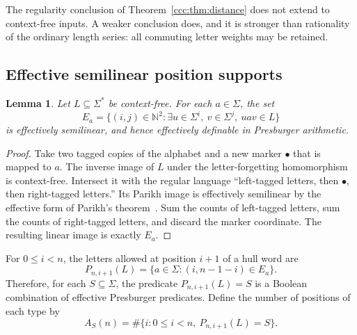 \documentclass[11pt,letterpaper]{article}
\newtheorem{lemma}[theorem]{Lemma}
\theoremstyle{definition}
\theoremstyle{remark}
\newcommand{\N}{\mathbb N}
\begin{document}
The regularity conclusion of Theorem~\ref{ccc:thm:distance} does not extend to
context-free inputs. A weaker conclusion does, and it is stronger than
rationality of the ordinary length series: all commuting letter weights may
be retained.

\subsection{Effective semilinear position supports}

\begin{lemma}\label{ccc:lem:positions}
Let $L\subseteq\Sigma^*$ be context-free. For each $a\in\Sigma$, the set
\begin{equation}
 E_a=\{(i,j)\in\N^2:\exists u\in\Sigma^i,\ v\in\Sigma^j,
                              \ uav\in L\}
 \label{ccc:eq:position-support}
\end{equation}
is effectively semilinear, and hence effectively definable in Presburger
arithmetic.
\end{lemma}
\begin{proof}
Take two tagged copies of the alphabet and a new marker $\bullet$ that is
mapped to $a$. The inverse image of $L$ under the letter-forgetting
homomorphism is context-free. Intersect it with the regular language
``left-tagged letters, then $\bullet$, then right-tagged letters.''
Its Parikh image is effectively semilinear by the effective form of Parikh's
theorem~\cite{EGKL}. Sum the counts of left-tagged letters, sum the counts of
right-tagged letters, and discard the marker coordinate. The resulting
linear image is exactly $E_a$.
\end{proof}

For $0\leq i<n$, the letters allowed at position $i+1$ of a hull word are
\[
 P_{n,i+1}(L)=\{a\in\Sigma:(i,n-1-i)\in E_a\}.
\]
Therefore, for each $S\subseteq\Sigma$, the predicate
$P_{n,i+1}(L)=S$ is a Boolean combination of effective Presburger predicates.
Define the number of positions of each type by
\begin{equation}
 A_S(n)=\#\{i:0\leq i<n,\ P_{n,i+1}(L)=S\}.
 \label{ccc:eq:position-count}
\end{equation}
\end{document}

